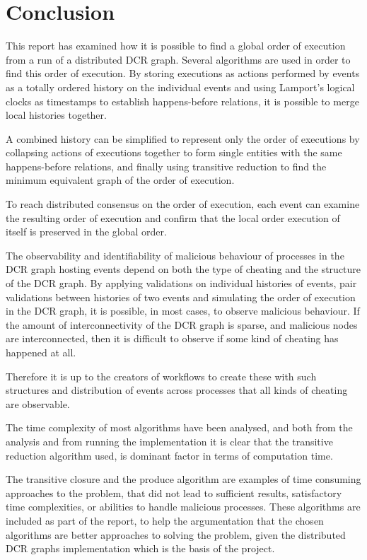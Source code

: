 \chapter*{Conclusion}
This report has examined how it is possible to find a global order of execution from a run of a distributed DCR graph. Several algorithms are used in order to find this order of execution. By storing executions as actions performed by events as a totally ordered history on the individual events and using Lamport's logical clocks as timestamps to establish happens-before relations, it is possible to merge local histories together.

A combined history can be simplified to represent only the order of executions by collapsing actions of executions together to form single entities with the same happens-before relations, and finally using transitive reduction to find the minimum equivalent graph of the order of execution.

To reach distributed consensus on the order of execution, each event can examine the resulting order of execution and confirm that the local order execution of itself is preserved in the global order.

The observability and identifiability of malicious behaviour of processes in the DCR graph hosting events depend on both the type of cheating and the structure of the DCR graph. By applying validations on individual histories of events, pair validations between histories of two events and simulating the order of execution in the DCR graph, it is possible, in most cases, to observe malicious behaviour. If the amount of interconnectivity of the DCR graph is sparse, and malicious nodes are interconnected, then it is difficult to observe if some kind of cheating has happened at all.

Therefore it is up to the creators of workflows to create these with such structures and distribution of events across processes that all kinds of cheating are observable.

The time complexity of most algorithms have been analysed, and both from the analysis and from running the implementation it is clear that the transitive reduction algorithm used, is dominant factor in terms of computation time.

\newpar The transitive closure and the produce algorithm are examples of time consuming approaches to the problem, that did not lead to sufficient results, satisfactory time complexities, or abilities to handle malicious processes. These algorithms are included as part of the report, to help the argumentation that the chosen algorithms are better approaches to solving the problem, given the distributed DCR graphs implementation which is the basis of the project.

